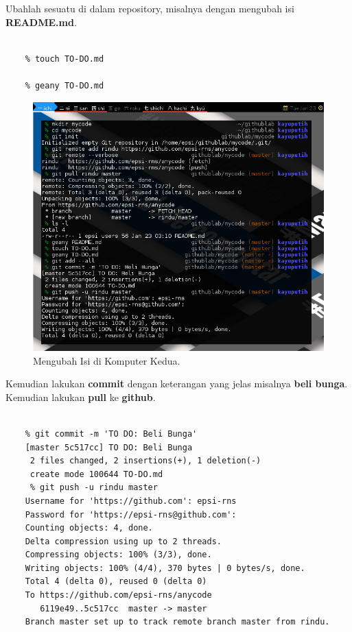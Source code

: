 \documentclass{article}
\begin{document}
\newpage

Ubahlah sesuatu di dalam repository, misalnya dengan
mengubah isi \textbf{README.md}. 

\begin{lstlisting}[style=BashInputStyle]
    % geany README.md

    % touch TO-DO.md

    % geany TO-DO.md
\end{lstlisting}

\begin{figure}[H]
  \includegraphics[width=\linewidth]{gitcli-second-change-content.png}
  \caption{Mengubah Isi di Komputer Kedua.}
  \label{fig:git.second}
\end{figure}


\newpage

Kemudian lakukan \textbf{commit}
dengan keterangan yang jelas misalnya \textbf{beli bunga}.
Kemudian lakukan \textbf{pull} ke \textbf{github}.

\begin{lstlisting}[style=BashInputStyle]
    % git add --all

    % git commit -m 'TO DO: Beli Bunga'
    [master 5c517cc] TO DO: Beli Bunga
     2 files changed, 2 insertions(+), 1 deletion(-)
     create mode 100644 TO-DO.md
     % git push -u rindu master
    Username for 'https://github.com': epsi-rns
    Password for 'https://epsi-rns@github.com': 
    Counting objects: 4, done.
    Delta compression using up to 2 threads.
    Compressing objects: 100% (3/3), done.
    Writing objects: 100% (4/4), 370 bytes | 0 bytes/s, done.
    Total 4 (delta 0), reused 0 (delta 0)
    To https://github.com/epsi-rns/anycode
       6119e49..5c517cc  master -> master
    Branch master set up to track remote branch master from rindu.
\end{lstlisting}
\end{document}
